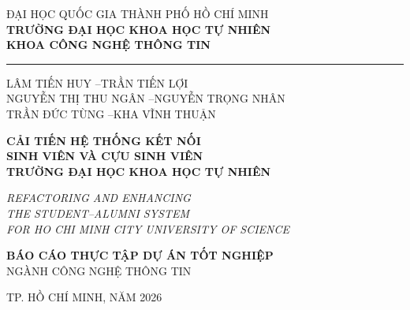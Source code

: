 \documentclass[12pt,a4paper,oneside]{report}
\begin{document}
\thispagestyle{empty}
\begin{center}
{\fontsize{13}{16}\selectfont ĐẠI HỌC QUỐC GIA THÀNH PHỐ HỒ CHÍ MINH}\\[2pt]
{\fontsize{13}{16}\selectfont \textbf{TRƯỜNG ĐẠI HỌC KHOA HỌC TỰ NHIÊN}}\\[2pt]
{\fontsize{13}{16}\selectfont \textbf{KHOA CÔNG NGHỆ THÔNG TIN}}\\[4pt]
\rule{5cm}{0.6pt}

\vspace{1.6cm}
\vspace{0.4cm}

{\fontsize{13}{16}\selectfont LÂM TIẾN HUY \quad--\quad TRẦN TIẾN LỢI}\\[3pt]
{\fontsize{13}{16}\selectfont NGUYỄN THỊ THU NGÂN \quad--\quad NGUYỄN TRỌNG NHÂN}\\[3pt]
{\fontsize{13}{16}\selectfont TRẦN ĐỨC TÙNG \quad--\quad KHA VĨNH THUẬN}

\vspace{1.8cm}
{\fontsize{16}{22}\selectfont\bfseries CẢI TIẾN HỆ THỐNG KẾT NỐI\\[6pt]
SINH VIÊN VÀ CỰU SINH VIÊN\\[6pt]
TRƯỜNG ĐẠI HỌC KHOA HỌC TỰ NHIÊN}

\vspace{0.8cm}
{\fontsize{13}{17}\selectfont\itshape REFACTORING AND ENHANCING\\
THE STUDENT--ALUMNI SYSTEM\\
FOR HO CHI MINH CITY UNIVERSITY OF SCIENCE}

\vspace{1.6cm}
{\fontsize{14}{18}\selectfont\bfseries BÁO CÁO THỰC TẬP DỰ ÁN TỐT NGHIỆP}\\[6pt]
{\fontsize{13}{16}\selectfont NGÀNH CÔNG NGHỆ THÔNG TIN}

\vfill
{\fontsize{13}{16}\selectfont TP. HỒ CHÍ MINH, NĂM 2026}
\end{center}
\newpage
\end{document}
